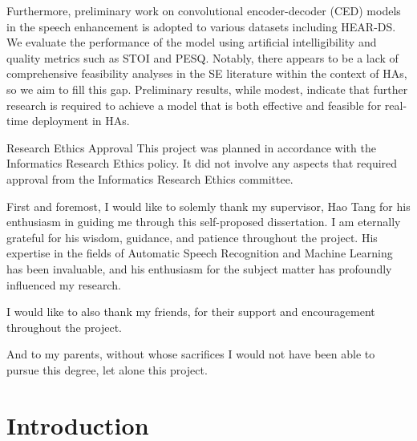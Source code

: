 \documentclass[logo,bsc,singlespacing,parskip,online]{infthesis}
\begin{document}
\begin{preliminary}
{   Furthermore, preliminary work on convolutional encoder-decoder (CED) 
   models in the speech enhancement is adopted to various datasets 
   including HEAR-DS. We evaluate the performance of the model 
   using artificial intelligibility and quality metrics such as STOI and PESQ. 
   Notably, there appears to be a lack of comprehensive feasibility analyses in 
   the SE literature within the context of HAs, so we aim to fill this gap. 
   Preliminary results, while modest, indicate that further research is required 
   to achieve a model that is both effective and feasible for real-time deployment in HAs.
}

\maketitle

\newenvironment{ethics}
   {\begin{frontenv}{Research Ethics Approval}{\LARGE}}
   {\end{frontenv}\newpage}

\begin{ethics}
This project was planned in accordance with the Informatics Research
Ethics policy. It did not involve any aspects that required approval
from the Informatics Research Ethics committee.

\standarddeclaration
\end{ethics}


\begin{acknowledgements}
First and foremost, I would like to solemly thank my supervisor, Hao Tang for 
his enthusiasm in guiding me through this self-proposed dissertation. I am eternally grateful for his wisdom, guidance, and patience throughout the project.
His expertise in the fields of Automatic Speech Recognition and Machine Learning has been invaluable, and his enthusiasm for the subject matter has profoundly influenced my research.

I would like to also thank my friends, for their support and encouragement throughout the project. 

And to my parents, without whose sacrifices I would not have been able to pursue this degree, let alone this project.
\end{acknowledgements}


\tableofcontents
\end{preliminary}


\chapter{Introduction}
\end{document}
